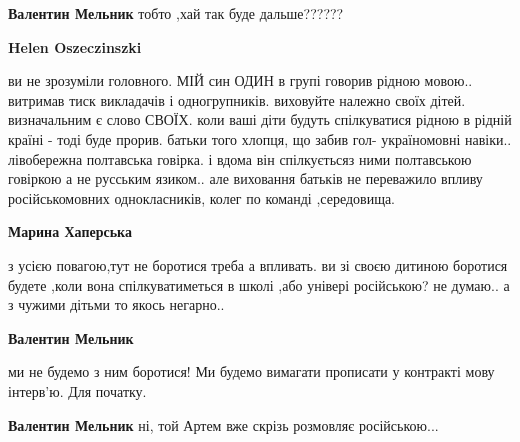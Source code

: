 \begin{itemize}
\begin{itemize}
\textbf{Валентин Мельник} тобто ,хай так буде дальше??????

 
\textbf{Helen Oszeczinszki} 

ви не зрозуміли головного. МІЙ син ОДИН в групі говорив рідною мовою.. витримав
тиск викладачів і одногрупників. виховуйте належно своїх дітей. визначальним є
слово СВОЇХ. коли ваші діти будуть спілкуватися рідною в рідній країні - тоді
буде прорив. батьки того хлопця, що забив гол- україномовні навіки.. лівобережна
полтавська говірка. і вдома він спілкуєтьсяз ними полтавською говіркою а не
русським язиком.. але виховання батьків не переважило впливу російськомовних
однокласників, колег по команді ,середовища.

 
\textbf{Марина Хаперська} 

з усією повагою,тут не боротися треба а впливать. ви зі своєю дитиною боротися
будете ,коли вона спілкуватиметься в школі ,або універі російською? не думаю..
а з чужими дітьми то якось негарно..


 
\textbf{Валентин Мельник} 

ми не будемо з ним боротися!
Ми будемо вимагати прописати у контракті мову інтерв'ю.
Для початку.


 
\textbf{Валентин Мельник} ні, той Артем вже скрізь розмовляє російською...

 

\end{itemize}
\end{itemize}
